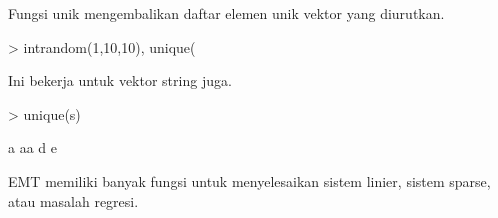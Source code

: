\documentclass[a4paper,10pt]{article}
\begin{document}
\begin{eulernotebook}
\begin{eulercomment}
\begin{eulercomment}
\begin{eulercomment}
\begin{eulercomment}
\begin{eulercomment}
\begin{eulercomment}
\begin{euleroutput}
\end{euleroutput}
\begin{eulercomment}
Fungsi unik mengembalikan daftar elemen unik vektor yang diurutkan.
\end{eulercomment}
\begin{eulerprompt}
> intrandom(1,10,10), unique(%
\end{eulerprompt}
\begin{euleroutput}
  [4,  4,  9,  2,  6,  5,  10,  6,  5,  1]
  [1,  2,  4,  5,  6,  9,  10]
\end{euleroutput}
\begin{eulercomment}
Ini bekerja untuk vektor string juga.
\end{eulercomment}
\begin{eulerprompt}
> unique(s)
\end{eulerprompt}
\begin{euleroutput}
  a
  aa
  d
  e
\end{euleroutput}
\begin{eulercomment}
EMT memiliki banyak fungsi untuk menyelesaikan sistem linier, sistem
sparse, atau masalah regresi.


\end{eulercomment}
\end{eulercomment}
\end{eulercomment}
\end{eulercomment}
\end{eulercomment}
\end{eulercomment}
\end{eulercomment}
\end{eulernotebook}
\end{document}
